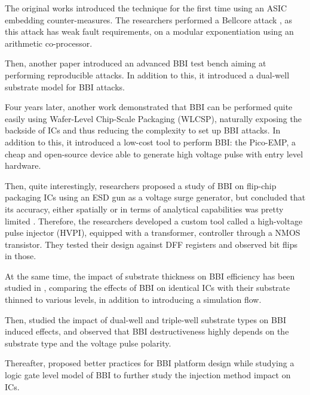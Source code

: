 		The original works \cite{bbiOrigin, bbiSecond} introduced the technique for the first time using an ASIC embedding counter-measures.
		The researchers performed a Bellcore attack \cite{bellcore}, as this attack has weak fault requirements, on a modular exponentiation using an arithmetic co-processor.
		
		Then, another paper \cite{bbiThird} introduced an advanced BBI test bench aiming at performing reproducible attacks.
		In addition to this, it introduced a dual-well substrate model for BBI attacks.
		
		Four years later, another work \cite{bbiColin} demonstrated that BBI can be performed quite easily using Wafer-Level Chip-Scale Packaging (WLCSP), naturally exposing the backside of ICs and thus reducing the complexity to set up BBI attacks.
		In addition to this, it introduced a low-cost tool to perform BBI: the Pico-EMP, a cheap and open-source device able to generate high voltage pulse with entry level hardware.
		
		Then, quite interestingly, researchers proposed a study of BBI on flip-chip packaging ICs using an ESD gun as a voltage surge generator, but concluded that its accuracy, either spatially or in terms of analytical capabilities was pretty limited \cite{japbbi, japbbi2}.
		Therefore, the researchers developed a custom tool called a high-voltage pulse injector (HVPI), equipped with a transformer, controller through a NMOS transistor.
		They tested their design against DFF registers and observed bit flips in those.
		
		At the same time, the impact of substrate thickness on BBI efficiency has been studied in \cite{mybbiCosade}, comparing the effects of BBI on identical ICs with their substrate thinned to various levels, in addition to introducing a simulation flow.
		
		Then, \cite{mybbiFdtc2022} studied the impact of dual-well and triple-well substrate types on BBI induced effects, and observed that BBI destructiveness highly depends on the substrate type and the voltage pulse polarity.
		
		Thereafter, \cite{mybbifdtc2023} proposed better practices for BBI platform design while studying a logic gate level model of BBI to further study the injection method impact on ICs.
		
